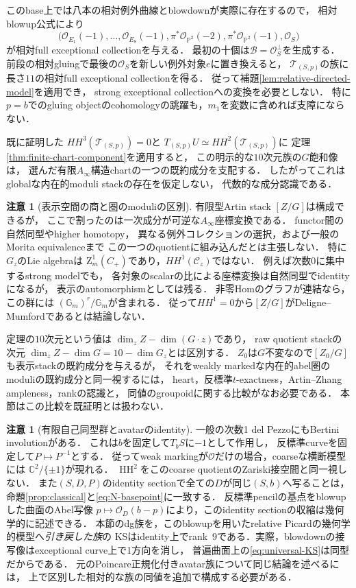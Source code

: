 \documentclass[11pt,a4paper]{ltjsarticle}
\theoremstyle{definition}
\newtheorem{remark}[theorem]{注意}
\newcommand{\OO}{\mathcal O}
\newcommand{\BB}{\mathcal B}
\newcommand{\TT}{\mathcal T}
\begin{document}
このbase上では八本の相対例外曲線とblowdownが実際に存在するので，
相対blowup公式により
\[
 \bigl(
 \OO_{E_1}(-1),\ldots,\OO_{E_8}(-1),
 \pi^*\OO_{\mathbb P^2}(-2),
 \pi^*\OO_{\mathbb P^2}(-1),\OO_S
 \bigr)
\]
が相対full exceptional collectionを与える．
最初の十個は$\BB=\OO_S^\perp$を生成する．
前段の相対gluingで最後の$\OO_S$を新しい例外対象$e$に置き換えると，
$\TT_{(S,p)}$の族に長さ$11$の相対full exceptional collectionを得る．
従って補題\ref{lem:relative-directed-model}を適用でき，
strong exceptional collectionへの変換を必要としない．
特に$p=b$でのgluing objectのcohomologyの跳躍も，$m_1$を変数に含めれば支障にならない．

既に証明した
$HH^3(\TT_{(S,p)})=0$と
$T_{(S,p)}U\simeq HH^2(\TT_{(S,p)})$に
定理\ref{thm:finite-chart-component}を適用すると，
この明示的な$10$次元族の$G$飽和像は，
選んだ有限$A_\infty$構造chartの一つの既約成分を支配する．
したがってこれはglobalな内在的moduli stackの存在を仮定しない，
代数的な成分認識である．

\begin{remark}[表示空間の商と圏のmoduliの区別]
有限型Artin stack $[Z/G]$は構成できるが，
ここで割ったのは一次成分が可逆な$A_\infty$座標変換である．
functor間の自然同型やhigher homotopy，
異なる例外コレクションの選択，および一般のMorita equivalenceまで
この一つのquotientに組み込んだとは主張しない．
特に$G_z$のLie algebraは
$\mathrm Z_m^1(C_+)$であり，$HH^1(\mathcal C_z)$ではない．
例えば次数$0$に集中するstrong modelでも，
各対象のscalarの比による座標変換は自然同型でidentityになるが，
表示のautomorphismとしては残る．
非零Homのグラフが連結なら，この群には
$(\mathbb G_m)^r/\mathbb G_m$が含まれる．
従って$HH^1=0$から$[Z/G]$がDeligne--Mumfordであるとは結論しない．

定理の$10$次元という値は
$\dim_zZ-\dim(G\cdot z)$であり，
raw quotient stackの次元
$\dim_zZ-\dim G=10-\dim G_z$とは区別する．
$Z_0$は$G$不変なので$[Z_0/G]$も表示stackの既約成分を与えるが，
それをweakly markedな内在的abel圏のmoduliの既約成分と同一視するには，
heart，反標準$t$-exactness，Artin--Zhang ampleness，rankの認識と，
同値のgroupoidに関する比較がなお必要である．
本節はこの比較を既証明とは扱わない．
\end{remark}

\begin{remark}[有限自己同型群とavatarのidentity]
一般の次数1 del PezzoにもBertini involutionがある．
これは$b$を固定して$T_bS$に$-1$として作用し，
反標準curveを固定して$P\mapsto P^{-1}$とする．
従ってweak markingが$\OO$だけの場合，coarseな横断模型には
$\mathbb C^2/\{\pm1\}$が現れる．
$\operatorname{HH}^2$をこのcoarse quotientのZariski接空間と同一視しない．
また$(S,D,P)$のidentity sectionで全ての$D$が同じ$(S,b)$へ写ることは，
命題\ref{prop:classical}と\eqref{eq:N-basepoint}に一致する．
反標準pencilの基点をblowupした曲面のAbel写像
$p\mapsto\OO_D(b-p)$により，このidentity sectionの収縮は幾何学的に記述できる．
本節のdg族を，このblowupを用いたrelative Picardの幾何学的模型へ\emph{引き戻した族}の
KSはidentity上でrank~9である．実際，blowdownの接写像はexceptional curve上で1方向を消し，
普遍曲面上の\eqref{eq:universal-KS}は同型だからである．
元のPoincare正規化付きavatar族について同じ結論を述べるには，
上で区別した相対的な族の同値を追加で構成する必要がある．
\end{remark}
\end{document}
